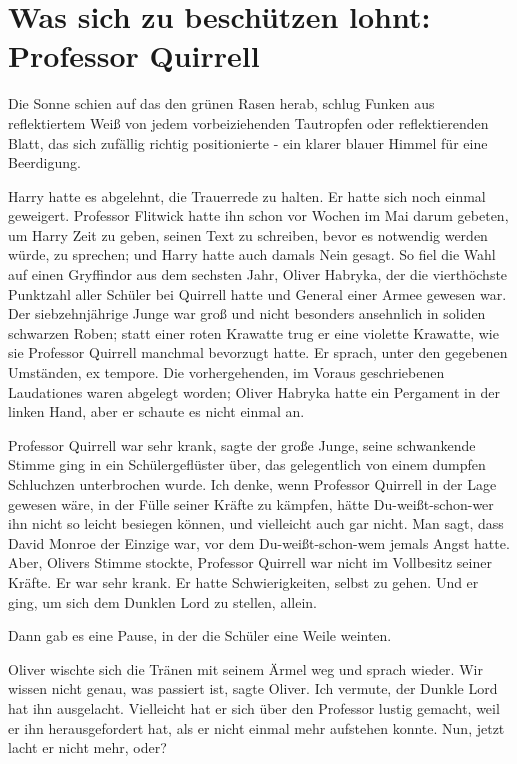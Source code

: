 \chapter{Was sich zu beschützen lohnt: Professor Quirrell}

Die Sonne schien auf das den grünen Rasen herab, schlug Funken aus reflektiertem
Weiß von jedem vorbeiziehenden Tautropfen oder reflektierenden Blatt, das sich
zufällig richtig positionierte - ein klarer blauer Himmel für eine Beerdigung.

Harry hatte es abgelehnt, die Trauerrede zu halten. Er hatte sich noch einmal
geweigert. Professor Flitwick hatte ihn schon vor Wochen im Mai darum gebeten,
um Harry Zeit zu geben, seinen Text zu schreiben, bevor es notwendig werden
würde, zu sprechen; und Harry hatte auch damals Nein gesagt. So fiel die Wahl
auf einen Gryffindor aus dem sechsten Jahr, Oliver Habryka, der die vierthöchste
Punktzahl aller Schüler bei Quirrell hatte und General einer Armee gewesen war.
Der siebzehnjährige Junge war groß und nicht besonders ansehnlich in soliden
schwarzen Roben; statt einer roten Krawatte trug er eine violette Krawatte, wie
sie Professor Quirrell manchmal bevorzugt hatte. Er sprach, unter den gegebenen
Umständen, ex tempore. Die vorhergehenden, im Voraus geschriebenen Laudationes
waren abgelegt worden; Oliver Habryka hatte ein Pergament in der linken Hand,
aber er schaute es nicht einmal an.

\glqq{}Professor Quirrell war sehr krank\grqq{}, sagte der große Junge, seine
schwankende Stimme ging in ein Schülergeflüster über, das gelegentlich von einem
dumpfen Schluchzen unterbrochen wurde. \glqq{}Ich denke, wenn Professor Quirrell
in der Lage gewesen wäre, in der Fülle seiner Kräfte zu kämpfen, hätte
Du-weißt-schon-wer ihn nicht so leicht besiegen können, und vielleicht auch gar
nicht. Man sagt, dass David Monroe der Einzige war, vor dem Du-weißt-schon-wem
jemals Angst hatte. Aber\grqq{}, Olivers Stimme stockte, \glqq{}Professor
Quirrell war nicht im Vollbesitz seiner Kräfte. Er war sehr krank. Er hatte
Schwierigkeiten, selbst zu gehen. Und er ging, um sich dem Dunklen Lord zu
stellen, allein.\grqq{}

Dann gab es eine Pause, in der die Schüler eine Weile weinten.

Oliver wischte sich die Tränen mit seinem Ärmel weg und sprach wieder. \glqq{}Wir
wissen nicht genau, was passiert ist\grqq{}, sagte Oliver. \glqq{}Ich vermute,
der Dunkle Lord hat ihn ausgelacht. Vielleicht hat er sich über den Professor
lustig gemacht, weil er ihn herausgefordert hat, als er nicht einmal mehr
aufstehen konnte. Nun, jetzt lacht er nicht mehr, oder?\grqq{}


